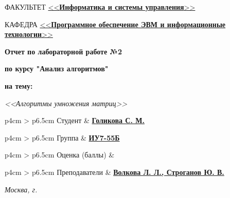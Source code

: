 \begin{titlepage}
	\begin{flushleft}
		\fontsize{12pt}{0.8\baselineskip}\selectfont 
		
		ФАКУЛЬТЕТ \uline{<<\textbf{Информатика и системы управления}>> \hfill}
		
		КАФЕДРА \uline{\mbox{\hspace{4mm}} <<\textbf{Программное обеспечение ЭВМ и информационные технологии}>> \hfill}
	\end{flushleft}

	\vfill

	\begin{center}
		\fontsize{20pt}{\baselineskip}\selectfont

		\textbf{Отчет по лабораторной работе №2}

		\textbf{по курсу "Анализ алгоритмов"}

		\textbf{на тему:}
	\end{center}

	\begin{center}
		\fontsize{18pt}{0.6cm}\selectfont 
		
			\textit{<<Алгоритмы умножения матриц>>}
		
	\end{center}

	\vfill

	\begin{table}[h!]
		\fontsize{12pt}{0.7\baselineskip}\selectfont
		
		\begin{signstabular}[0.55]{p{4cm} > {\centering\arraybackslash}p{6.5cm}}
				Студент & \uline{\textbf{Голикова С. М.} \hfill} 
		\end{signstabular}
		
		\begin{signstabular}[0.55]{p{4cm} > {\centering\arraybackslash}p{6.5cm}}
				Группа & \uline{\textbf{ИУ7-55Б} \hfill} 
		\end{signstabular}
		
		\begin{signstabular}[0.55]{p{4cm} > {\centering\arraybackslash}p{6.5cm}}
				Оценка (баллы) & \uline{\mbox{\hspace*{6.5cm}}} 
		\end{signstabular}
		
		\begin{signstabular}[0.55]{p{4cm} > {\centering\arraybackslash}p{6.5cm}}
				Преподаватели & \uline{\textbf{Волкова Л. Л., Строганов Ю. В.} \hfill}
		\end{signstabular}
	\end{table}
	
	\vfill

	\begin{center}
		\normalsize \textit{Москва, \the\year г.}
	\end{center}
\end{titlepage}